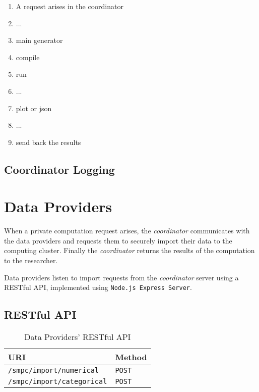 
\begin{enumerate}
\item A request arises in the coordinator
\item ...
\item main generator
\item compile
\item run
\item ...
\item plot or json
\item ...
\item send back the results
\end{enumerate}


\subsection{Coordinator Logging}\label{ss:coordinator-logging}




\section{Data Providers}\label{s:impl-data-providers}
When a private computation request arises, the \textit{coordinator} communicates with the data providers and requests them to securely import their data to the computing cluster.
Finally the \textit{coordinator} returns the results of the computation to the researcher.

Data providers listen to import requests from the \textit{coordinator} server using a RESTful API, implemented using \texttt{Node.js Express Server}.



\subsection{RESTful API}\label{ss:data-providers-restful-api}

\begin{table}[H]
\centering
\caption{Data Providers' RESTful API}
\label{t:data-providers-api}
\begin{tabular}{@{}ll@{}}
\toprule
URI                                & Method        \\ \midrule
\texttt{/smpc/import/numerical}    & \texttt{POST} \\
\texttt{/smpc/import/categorical}  & \texttt{POST} \\ \bottomrule
\end{tabular}
\end{table}


